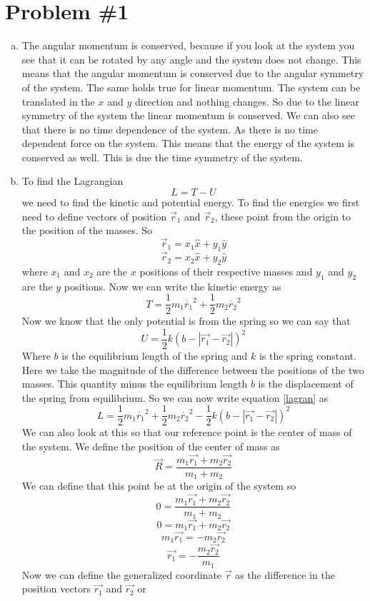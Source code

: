 \documentclass[11pt]{article}
\numberwithin{equation}{section}
\begin{document}


\section{Problem \#1}
\begin{enumerate}[(a)]
\item
The angular momentum is conserved, because if you look at the system you see that it can be rotated by any angle and the system does not change. This means that the angular momentum is conserved due to the angular symmetry of the system. The same holds true for linear momentum. The system can be translated in the $x$ and $y$ direction and nothing changes. So due to the linear symmetry of the system the linear momentum is conserved. We can also see that there is no time dependence of the system. As there is no time dependent force on the system. This means that the energy of the system is conserved as well. This is due the time symmetry of the system.
\item
To find the Lagrangian 
\begin{equation}
L = T - U
\label{lagran}
\end{equation}
we need to find the kinetic and potential energy. To find the energies we first need to define vectors of position $\vec{r}_1$ and $\vec{r}_2$, these point from the origin to the position of the masses. So
$$\vec{r}_1 = x_1\hat{x}+y_1\hat{y}$$
$$\vec{r}_2 = x_2\hat{x}+y_2\hat{y}$$
where $x_1$ and $x_2$ are the $x$ positions of their respective masses and $y_1$ and $y_2$ are the $y$ positions. Now we can write the kinetic energy as
$$T = \frac{1}{2}m_1\dot{r_1}^2+ \frac{1}{2}m_2\dot{r_2}^2$$
Now we know that the only potential is from the spring so we can say that 
$$U = \frac{1}{2}k\left(b-|\vec{r_1} - \vec{r_2}|\right)^2$$
Where $b$ is the equilibrium length of the spring and $k$ is the spring constant. Here we take the magnitude of the difference between the positions of the two masses. This quantity minus the equilibrium length $b$ is the displacement of the spring from equilibrium.
So we can now write equation \ref{lagran} as
$$L = \frac{1}{2}m_1\dot{r_1}^2+ \frac{1}{2}m_2\dot{r_2}^2 - \frac{1}{2}k\left(b-|\vec{r_1} - \vec{r_2}|\right)^2$$
We can also look at this so that our reference point is the center of mass of the system. We define the position of the center of mass as
$$\vec{R} = \frac{m_1\vec{r_1} +m_2\vec{r_2}}{m_1+m_2}$$
We can define that this point be at the origin of the system so
$$0 = \frac{m_1\vec{r_1} +m_2\vec{r_2}}{m_1+m_2}$$
$$0 = m_1\vec{r_1} + m_2\vec{r_2}$$
$$m_1\vec{r_1} = - m_2\vec{r_2}$$
\begin{equation}
\vec{r_1} = - \frac{m_2\vec{r_2}}{m_1}
\label{r1}
\end{equation}
Now we can define the generalized coordinate $\vec{r}$ as the difference in the position vectors $\vec{r_1}$ and $\vec{r_2}$ or


\end{enumerate}
\end{document}
